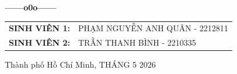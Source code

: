 \begin{titlepage}
\begin{center}
\begin{tabular}{l l}
    \end{tabular}
    
    \textbf{------o0o------}

    
    \begin{tabular}{l l}
        \textbf{SINH VIÊN 1:} & PHẠM NGUYỄN ANH QUÂN - 2212811 \\

        \textbf{SINH VIÊN 2:} & TRẦN THANH BÌNH - 2210335 
    \end{tabular}

    \vspace{1cm}

    Thành phố Hồ Chí Minh, THÁNG 5 2026

\end{center}

\end{titlepage}
